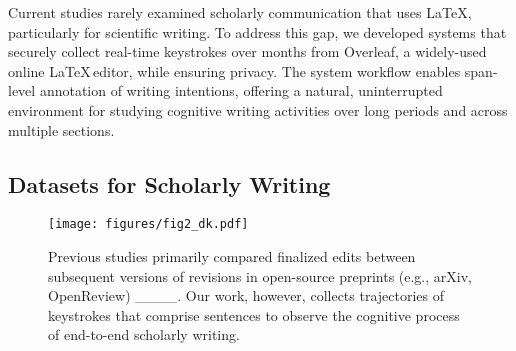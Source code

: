 Current studies rarely examined scholarly communication that uses \LaTeX, particularly for scientific writing. To address this gap, we developed systems that securely collect real-time keystrokes over months from Overleaf, a widely-used online \LaTeX $\,$editor, while ensuring privacy. The system workflow enables span-level annotation of writing intentions, offering a natural, uninterrupted environment for studying cognitive writing activities over long periods and across multiple sections.





\subsection{Datasets for Scholarly Writing} 

\begin{figure}[t!]
    \centering \hspace*{-0.3cm}
    \texttt{[image: figures/fig2\_dk.pdf]}
    \caption{Previous studies primarily compared finalized edits between subsequent versions of revisions in open-source preprints (e.g., arXiv, OpenReview) ____. Our work, however, collects trajectories of keystrokes that comprise sentences to observe the cognitive process of end-to-end scholarly writing.\vspace{-4mm}}
    \label{fig:comparison-previous}
\end{figure}

